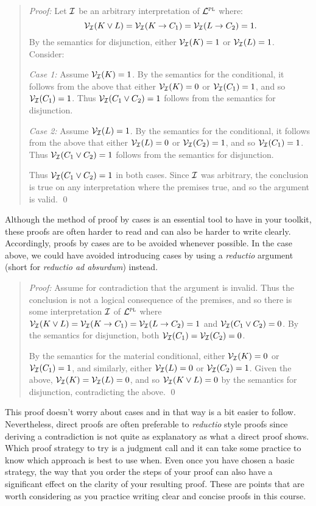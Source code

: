 \begin{quote} 
  \textit{Proof:}
  Let $\mathcal{I}$ be an arbitrary interpretation of $\mathcal{L}^{\textsc{pl}}$ where:
    $$\mathcal{V}_{\mathcal{I}}(K \vee L) = \mathcal{V}_{\mathcal{I}}(K \rightarrow C_1) = \mathcal{V}_{\mathcal{I}}(L \rightarrow C_2) = 1.$$ 
  By the semantics for disjunction, either $\mathcal{V}_{\mathcal{I}}(K) = 1$ or $\mathcal{V}_{\mathcal{I}}(L) = 1$.
  Consider:
  
  \textit{Case 1:}
  Assume $\mathcal{V}_{\mathcal{I}}(K) = 1$.
  By the semantics for the conditional, it follows from the above that either $\mathcal{V}_{\mathcal{I}}(K) = 0$ or $\mathcal{V}_{\mathcal{I}}(C_1) = 1$, and so $\mathcal{V}_{\mathcal{I}}(C_1) = 1$.
  Thus $\mathcal{V}_{\mathcal{I}}(C_1 \vee C_2) = 1$ follows from the semantics for disjunction.

  \textit{Case 2:}
  Assume $\mathcal{V}_{\mathcal{I}}(L) = 1$.
  By the semantics for the conditional, it follows from the above that either $\mathcal{V}_{\mathcal{I}}(L) = 0$ or $\mathcal{V}_{\mathcal{I}}(C_2) = 1$, and so $\mathcal{V}_{\mathcal{I}}(C_1) = 1$.
  Thus $\mathcal{V}_{\mathcal{I}}(C_1 \vee C_2) = 1$ follows from the semantics for disjunction.

  Thus $\mathcal{V}_{\mathcal{I}}(C_1 \vee C_2) = 1$ in both cases. 
  Since $\mathcal{I}$ was arbitrary, the conclusion is true on any interpretation where the premises true, and so the argument is valid. 
  \qed
\end{quote}

Although the method of proof by cases is an essential tool to have in your toolkit, these proofs are often harder to read and can also be harder to write clearly.
Accordingly, proofs by cases are to be avoided whenever possible.
In the case above, we could have avoided introducing cases by using a \textit{reductio} argument (short for \textit{reductio ad absurdum}) instead.

\begin{quote} 
  \textit{Proof:}
  Assume for contradiction that the argument is invalid.
  Thus the conclusion is not a logical consequence of the premises, and so there is some interpretation $\mathcal{I}$ of $\mathcal{L}^{\textsc{pl}}$ where $\mathcal{V}_{\mathcal{I}}(K \vee L) = \mathcal{V}_{\mathcal{I}}(K \rightarrow C_1) = \mathcal{V}_{\mathcal{I}}(L \rightarrow C_2) = 1$ and $\mathcal{V}_{\mathcal{I}}(C_1 \vee C_2) = 0$. 
  By the semantics for disjunction, both $\mathcal{V}_{\mathcal{I}}(C_1) = \mathcal{V}_{\mathcal{I}}(C_2) = 0$.  

  By the semantics for the material conditional, either $\mathcal{V}_{\mathcal{I}}(K) = 0$ or $\mathcal{V}_{\mathcal{I}}(C_1) = 1$, and similarly, either $\mathcal{V}_{\mathcal{I}}(L) = 0$ or $\mathcal{V}_{\mathcal{I}}(C_2) = 1$.
  Given the above, $\mathcal{V}_{\mathcal{I}}(K) = \mathcal{V}_{\mathcal{I}}(L) = 0$, and so $\mathcal{V}_{\mathcal{I}}(K \vee L) = 0$ by the semantics for disjunction, contradicting the above. 
  \qed
\end{quote}

This proof doesn't worry about cases and in that way is a bit easier to follow.
Nevertheless, direct proofs are often preferable to \textit{reductio} style proofs since deriving a contradiction is not quite as explanatory as what a direct proof shows.
Which proof strategy to try is a judgment call and it can take some practice to know which approach is best to use when.
Even once you have chosen a basic strategy, the way that you order the steps of your proof can also have a significant effect on the clarity of your resulting proof.
These are points that are worth considering as you practice writing clear and concise proofs in this course.

